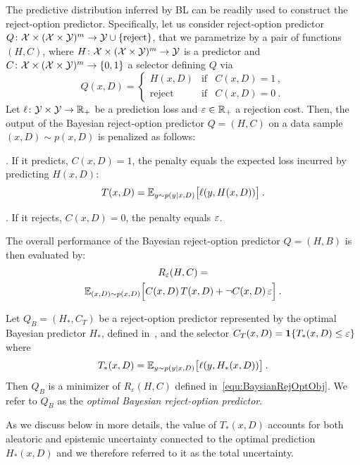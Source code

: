 The predictive distribution inferred by BL can be readily used to construct the reject-option predictor. Specifically, let us consider reject-option predictor $Q\colon{\cal X}\times({\cal X}\times{\cal Y})^m\rightarrow{\cal Y}\cup \{\rm reject\}$, that we parametrize by a pair of functions $(H,C)$, where $H\colon
{\cal X} \times ({\cal X} \times {\cal Y})^m \rightarrow {\cal Y}$ is a predictor and $C\colon{\cal X} \times ({\cal X} \times {\cal Y})^m \rightarrow \{0,1\}$ a selector defining $Q$ via
\begin{equation}
  \label{equ:BLRejectOptionPred}
   Q(x,D) = \left \{ \begin{array}{rcl}
      H(x,D) & \text{if} & C(x,D) = 1 \,,\\
      \text{reject} & \text{if} & C(x,D) = 0\:.
   \end{array}
   \right .
\end{equation}
%
Let $\ell\colon{\cal Y}\times{\cal Y}\rightarrow\mathbb{R}_+$ be a prediction loss and  $\varepsilon\in\mathbb{R}_+$ a rejection cost. Then, the output of the Bayesian reject-option predictor $Q=(H,C)$ on a data sample $(x,D)\sim p(x,D)$ is penalized as follows:

. If it predicts, $C(x,D)=1$, the penalty equals the expected loss incurred by predicting $H(x,D)$:
  \[
    T(x,D) = {\mathbb{E}}_{y\sim p(y|x,D)}\big [ \ell(y,H(x,D)) \big ]\:.
  \]

. If it rejects, $C(x,D)=0$, the penalty equals $\varepsilon$.

The overall performance of the Bayesian reject-option predictor $Q=(H,B)$ is then evaluated by:
\begin{multline}
\label{equ:BaysianRejOptObj}
   R_\varepsilon(H,C)=\\ {\mathbb{E}}_{(x,D)\sim p(x,D)} \Big [C(x,D)\, T(x,D)+ \neg C(x,D)\,\varepsilon 
       \Big ]    \:.
\end{multline}
%
\begin{theorem}\label{equ:BayesianRejOpt} Let $Q_B=(H_*,C_T)$ be a reject-option predictor represented by the optimal Bayesian predictor $H_*$, defined in~, and the selector $C_T(x,D) = \mathbf{1}{\{ { T_*(x,D) \leq \varepsilon }\}}$ where 
\begin{equation}
\label{equ:TotalUncertainty}
   T_*(x,D) = {\mathbb{E}}_{y\sim p(y\mid x,D)} \big [\ell(y,H_*(x,D))\big ] \:.
\end{equation}
%
Then \(Q_B\) is a minimizer of \(R_{\varepsilon}(H,C)\) defined in~\eqref{equ:BaysianRejOptObj}. We refer to \(Q_B\) as the \emph{optimal Bayesian reject-option predictor}.

\end{theorem}
%
As we discuss below in more details, the value of $T_*(x,D)$ accounts for both aleatoric and epistemic uncertainty connected to the optimal prediction $H_*(x,D)$ and we therefore referred to it as the total uncertainty.


